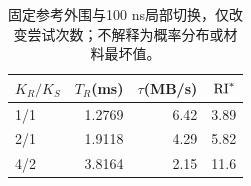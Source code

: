 \begin{table}[htbp]\centering\small
\begin{tabular}{@{}lrrr@{}}\toprule
$K_R/K_S$ & $T_R$(ms) & $\tau$(MB/s) & $\mathrm{RI}^*$\\\midrule
1/1 & 1.2769 & 6.42 & 3.89\\
2/1 & 1.9118 & 4.29 & 5.82\\
4/2 & 3.8164 & 2.15 & 11.6\\
\bottomrule\end{tabular}
\caption{固定参考外围与100 ns局部切换，仅改变尝试次数；不解释为概率分布或材料最坏值。}\end{table}
